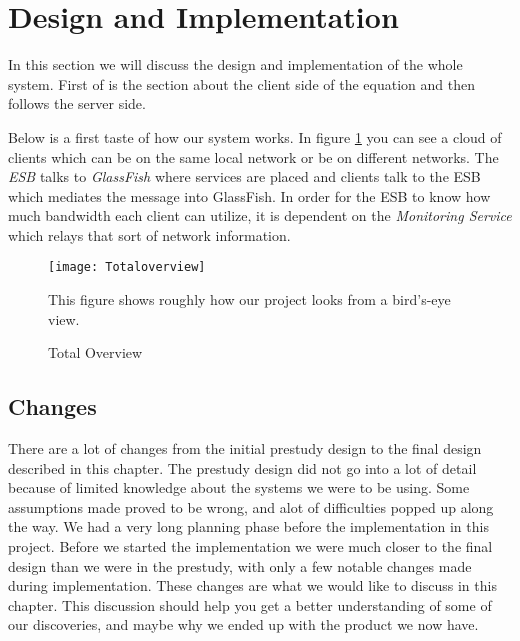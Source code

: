 \section{Design and Implementation}\label{Design and Implementation}
	In this section we will discuss the design and implementation of the whole system. First of is the section about the client side of the equation and then follows the server side. 
	
	Below is a first taste of how our system works. In figure \ref{fig:totaloverview} you can see a cloud of clients which can be on the same local network or be on different networks. The \textit{ESB} talks to \textit{GlassFish} where services are placed and clients talk to the ESB which mediates the message into GlassFish. In order for the ESB to know how much bandwidth each client can utilize, it is dependent on the \textit{Monitoring Service} which relays that sort of network information.
    
    \begin{figure}[H]
        \centering
        \texttt{[image: Totaloverview]}
        \caption{Total Overview}
        This figure shows roughly how our project looks from a bird's-eye view.
        \label{fig:totaloverview}
    \end{figure}

    
    
    
    \subsection{Changes}\label{Changes}
        There are a lot of changes from the initial prestudy design to the final design described in this chapter. The prestudy design did not go into a lot of detail because of limited knowledge about the systems we were to be using. Some assumptions made proved to be wrong, and alot of difficulties popped up along the way. We had a very long planning phase before the implementation in this project. Before we started the implementation we were much closer to the final design than we were in the prestudy, with only a few notable changes made during implementation. These changes are what we would like to discuss in this chapter. This discussion should help you get a better understanding of some of our discoveries, and maybe why we ended up with the product we now have.

        
        
        